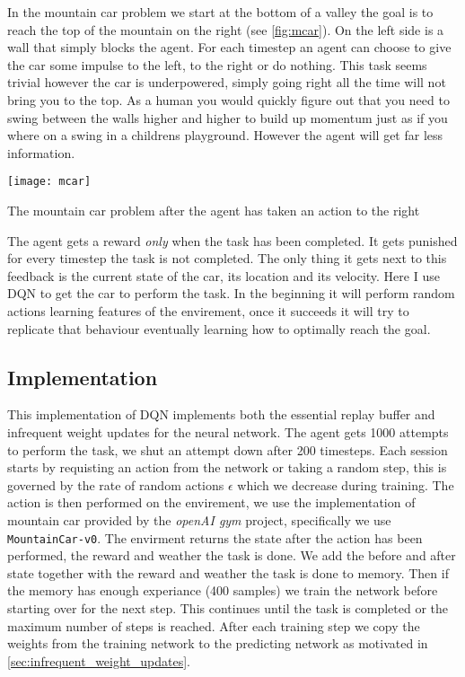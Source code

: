 \label{sec:mountain_car}
In the mountain car problem we start at the bottom of a valley the goal is to reach the top of the mountain on the right (see \autoref{fig:mcar}). On the left side is a wall that simply blocks the agent. For each timestep an agent can choose to give the car some impulse to the left, to the right or do nothing. This task seems trivial however the car is underpowered, simply going right all the time will not bring you to the top. As a human you would quickly figure out that you need to swing between the walls higher and higher to build up momentum just as if you where on a swing in a childrens playground. However the agent will get far less information. 

\begin{marginfigure}
    \texttt{[image: mcar]}
    \caption{The mountain car problem after the agent has taken an action to the right}
    \label{fig:mcar}
\end{marginfigure}

The agent gets a reward \textit{only} when the task has been completed. It gets punished for every timestep the task is not completed. The only thing it gets next to this feedback is the current state of the car, its location and its velocity. Here I use DQN to get the car to perform the task. In the beginning it will perform random actions learning features of the envirement, once it succeeds it will try to replicate that behaviour eventually learning how to optimally reach the goal.

\subsection{Implementation}
This implementation of DQN implements both the essential replay buffer and infrequent weight updates for the neural network. The agent gets 1000 attempts to perform the task, we shut an attempt down after 200 timesteps. Each session starts by requisting an action from the network or taking a random step, this is governed by the rate of random actions $\epsilon$ which we decrease during training. The action is then performed on the envirement, we use the implementation of mountain car provided by the \textit{openAI gym} project, specifically we use \texttt{MountainCar-v0}. The envirment returns the state after the action has been performed, the reward and weather the task is done. We add the before and after state together with the reward and weather the task is done to memory. Then if the memory has enough experiance (400 samples) we train the network before starting over for the next step. This continues until the task is completed or the maximum number of steps is reached. After each training step we copy the weights from the training network to the predicting network as motivated in \autoref{sec:infrequent_weight_updates}. 

